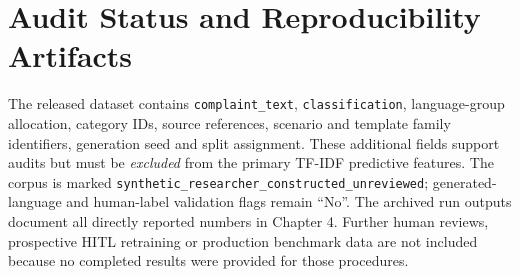 \chapter{Audit Status and Reproducibility Artifacts}
The released dataset contains \texttt{complaint\_text}, \texttt{classification}, language-group allocation, category IDs, source references, scenario and template family identifiers, generation seed and split assignment. These additional fields support audits but must be \emph{excluded} from the primary TF-IDF predictive features. The corpus is marked \texttt{synthetic\_researcher\_constructed\_unreviewed}; generated-language and human-label validation flags remain ``No''. The archived run outputs document all directly reported numbers in Chapter 4. Further human reviews, prospective HITL retraining or production benchmark data are not included because no completed results were provided for those procedures.
